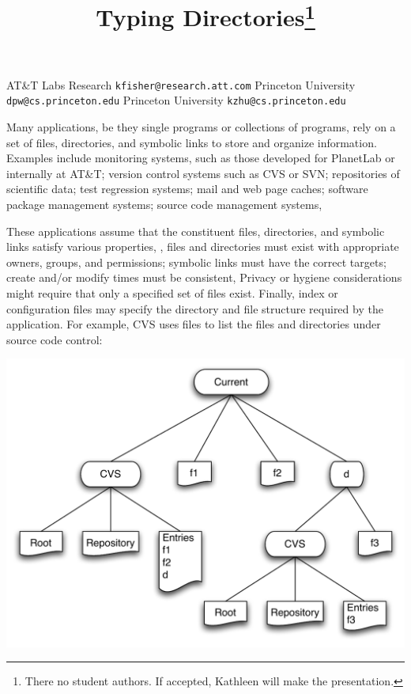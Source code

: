 \documentclass[nocopyrightspace,10pt]{sigplanconf}
\begin{document}
\title{Typing Directories\thanks{There no student authors.  If
    accepted, Kathleen will make the presentation.}}

	   {AT\&T Labs Research}
           {\small \tt kfisher@research.att.com}
	   {Princeton University}
           {\small \tt dpw@cs.princeton.edu}
	   {Princeton University}
           {\small \tt kzhu@cs.princeton.edu}
\maketitle{}
\date{}


Many applications, be they single programs or collections of programs,
rely on a set of files, directories, and symbolic links to
store and organize information.  Examples include monitoring
systems, such as those developed for PlanetLab or internally at AT\&T;
version control systems such as CVS or SVN; repositories of scientific
data; test regression systems; mail and web page caches; software
package management systems; source code management systems, \etc{}

These applications assume that the constituent files, directories, and
symbolic links satisfy various properties, \eg{}, files and
directories must exist with appropriate owners, groups, and
permissions; symbolic links must have the correct targets; create
and/or modify times must be consistent, \etc{}  Privacy or hygiene
considerations might require that only a specified set of files exist.
Finally, index or configuration files may specify the directory and
file structure required by the application.  For example, CVS uses 
 files to list the files and directories under source code
control:  

\includegraphics[scale=.4]{CVSStructure.pdf}
\end{document}
